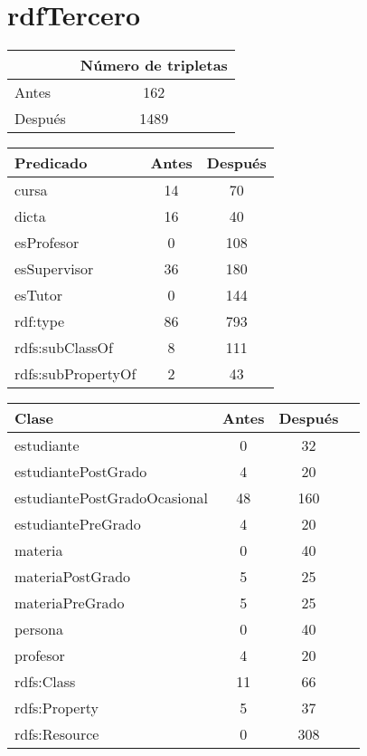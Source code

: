 \documentclass{article}
\newcommand{\tablaTripletas}[2]
{
\begin{tabular}{l|c}
 & Número de tripletas \\
 \hline
 Antes & #1 \\
 Después & #2 \\
\end{tabular}
}
\newcommand{\tablaPredicados}[1]
{
\begin{tabular}{l|c|c}
Predicado & Antes & Después \\
\hline
#1
\end{tabular}
}
\newcommand{\tablaInstancias}[1]
{
\begin{tabular}{l|c|c|c}
Clase & Antes & Después \\
\hline
#1
\end{tabular}
}
\newcommand{\resultadoDataSet}[5]
{
  \newpage

  \section{#1}

  \vspace{0.5cm}

  \tablaTripletas{#2}{#3}

  \vspace{1cm}

  \tablaPredicados{#4}

  \vspace{1cm}

  \tablaInstancias{#5}
}
\begin{document}
\resultadoDataSet{rdfTercero}{162}{1489}
{
    cursa & 14 & 70 \\
    dicta & 16 & 40 \\
    esProfesor & 0 & 108 \\
    esSupervisor & 36 & 180 \\
    esTutor & 0 & 144 \\
    rdf:type & 86 & 793 \\
    rdfs:subClassOf & 8 & 111 \\
    rdfs:subPropertyOf & 2 & 43 \\
}
{
    estudiante & 0 & 32 \\
    estudiantePostGrado & 4 & 20 \\
    estudiantePostGradoOcasional & 48 & 160 \\
    estudiantePreGrado & 4 & 20 \\
    materia & 0 & 40 \\
    materiaPostGrado & 5 & 25 \\
    materiaPreGrado & 5 & 25 \\
    persona & 0 & 40 \\
    profesor & 4 & 20 \\
    rdfs:Class & 11 & 66 \\
    rdfs:Property & 5 & 37 \\
    rdfs:Resource & 0 & 308 \\
}
\end{document}
